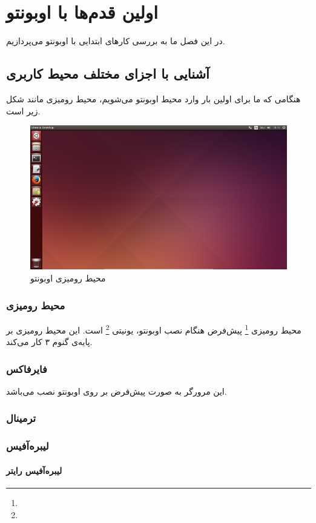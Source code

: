 \chapter{اولین قدم‌ها با اوبونتو}
در این فصل ما به بررسی کارهای ابتدایی با اوبونتو می‌پردازیم.
\section{آشنایی با اجزای مختلف محیط کاربری}
هنگامی که ما برای اولین بار وارد محیط اوبونتو می‌شویم، محیط رومیزی مانند شکل زیر است.

\begin{figure}[hbtp]
\centering
\includegraphics[scale=0.7]{pics/ubuntu-14.04.png}
\caption{محیط رومیزی اوبونتو}
\end{figure}
\subsection{محیط رومیزی}
محیط رومیزی
\footnote{}
پیش‌فرض هنگام نصب اوبونتو، یونیتی
\footnote{} 
است. این محیط رومیزی بر پایه‌ی گنوم ۳ کار می‌کند.
\subsection{فایرفاکس}
این مرورگر به صورت پیش‌فرض بر روی اوبونتو نصب می‌باشد.
\subsection{ترمینال}
\subsection{لیبره‌آفیس}
\subsubsection{لیبره‌آفیس رایتر}
